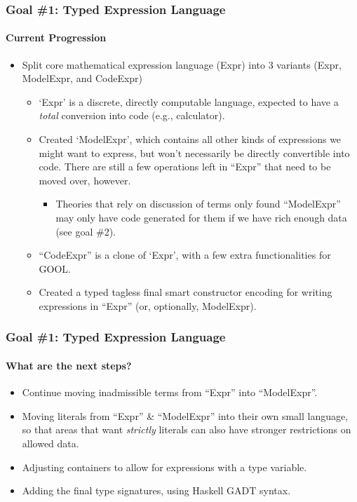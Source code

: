 \documentclass{beamer}
\begin{document}
\begin{frame}
    \frametitle{Goal \#1: Typed Expression Language}
    \framesubtitle{Current Progression}
    
    \begin{itemize}
        \item<2-> Split core mathematical expression language (Expr) into 3 variants (Expr, ModelExpr, and CodeExpr)
            \begin{itemize}
                \item<3-> `Expr' is a discrete, directly computable language, expected to have a \emph{total} conversion into code (e.g., calculator).
                \item<4-> Created `ModelExpr', which contains all other kinds of expressions we might want to express, but won't necessarily be directly convertible into code. There are still a few operations left in ``Expr'' that need to be moved over, however.
                    \begin{itemize}
                        \item<5-> Theories that rely on discussion of terms only found ``ModelExpr'' may only have code generated for them if we have rich enough data (see goal \#2).
                    \end{itemize}
                \item<6-> ``CodeExpr'' is a clone of `Expr', with a few extra functionalities for GOOL.
                \item<7-> Created a typed tagless final\cite{Carette2009finally} smart constructor encoding for writing expressions in ``Expr'' (or, optionally, ModelExpr).
            \end{itemize}
    \end{itemize}
\end{frame}

\begin{frame}
    \frametitle{Goal \#1: Typed Expression Language}
    \framesubtitle{What are the next steps?}
    
    \begin{itemize}
        \item<2-> Continue moving inadmissible terms from ``Expr'' into ``ModelExpr''.
        \item<3-> Moving literals from ``Expr'' \& ``ModelExpr'' into their own small language, so that areas that want \emph{strictly} literals can also have stronger restrictions on allowed data.
        \item<4-> Adjusting containers to allow for expressions with a type variable.
        \item<5-> Adding the final type signatures, using Haskell GADT syntax.
    \end{itemize}
\end{frame}
\end{document}
